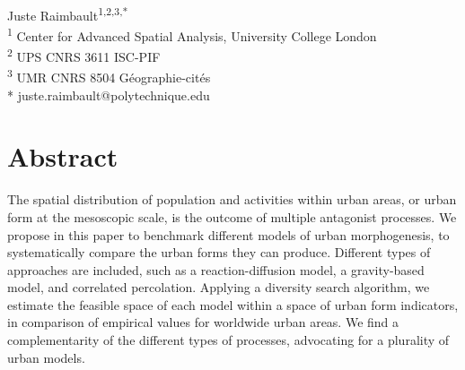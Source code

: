 \documentclass[10pt,letterpaper]{article}
\begin{document}
\vspace*{0.2in}

\begin{flushleft}
{\Large
\textbf{} %
}
\newline
\\
Juste Raimbault\textsuperscript{1,2,3,*}
\bigskip\\
\textsuperscript{1} Center for Advanced Spatial Analysis, University College London
\\
\textsuperscript{2} UPS CNRS 3611 ISC-PIF
\\
\textsuperscript{3} UMR CNRS 8504 G{\'e}ographie-cit{\'e}s
\bigskip\\
* juste.raimbault@polytechnique.edu



\end{flushleft}

\section*{Abstract}
\vspace{1cm}
The spatial distribution of population and activities within urban areas, or urban form at the mesoscopic scale, is the outcome of multiple antagonist processes. We propose in this paper to benchmark different models of urban morphogenesis, to systematically compare the urban forms they can produce. Different types of approaches are included, such as a reaction-diffusion model, a gravity-based model, and correlated percolation. Applying a diversity search algorithm, we estimate the feasible space of each model within a space of urban form indicators, in comparison of empirical values for worldwide urban areas. We find a complementarity of the different types of processes, advocating for a plurality of urban models.



\linenumbers

\cite{xu2021emergence}
\end{document}

